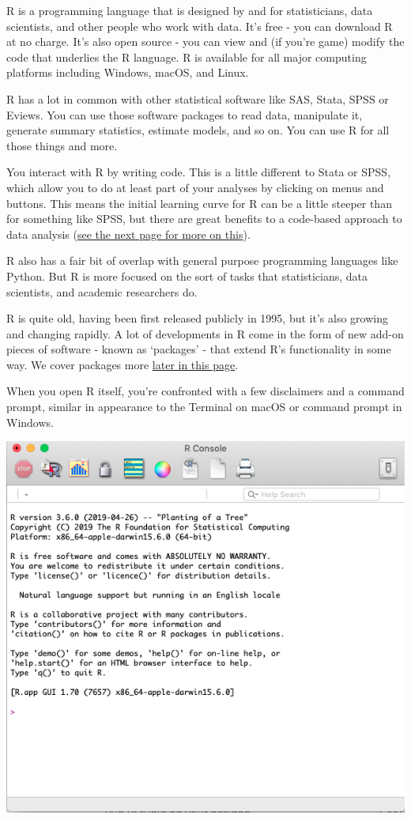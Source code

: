\documentclass[]{book}
\begin{document}
R is a programming language that is designed by and for statisticians, data scientists, and other people who work with data. It's free - you can download R at no charge. It's also open source - you can view and (if you're game) modify the code that underlies the R language. R is available for all major computing platforms including Windows, macOS, and Linux.

R has a lot in common with other statistical software like SAS, Stata, SPSS or Eviews. You can use those software packages to read data, manipulate it, generate summary statistics, estimate models, and so on. You can use R for all those things and more.

You interact with R by writing code. This is a little different to Stata or SPSS, which allow you to do at least part of your analyses by clicking on menus and buttons. This means the initial learning curve for R can be a little steeper than for something like SPSS, but there are great benefits to a code-based approach to data analysis (\protect\hyperlink{why-script}{see the next page for more on this}).

R also has a fair bit of overlap with general purpose programming languages like Python. But R is more focused on the sort of tasks that statisticians, data scientists, and academic researchers do.

R is quite old, having been first released publicly in 1995, but it's also growing and changing rapidly. A lot of developments in R come in the form of new add-on pieces of software - known as `packages' - that extend R's functionality in some way. We cover packages more \protect\hyperlink{packages}{later in this page}.

When you open R itself, you're confronted with a few disclaimers and a command prompt, similar in appearance to the Terminal on macOS or command prompt in Windows.

\includegraphics[width=7.99in]{atlas/r_screenshot}
\end{document}
